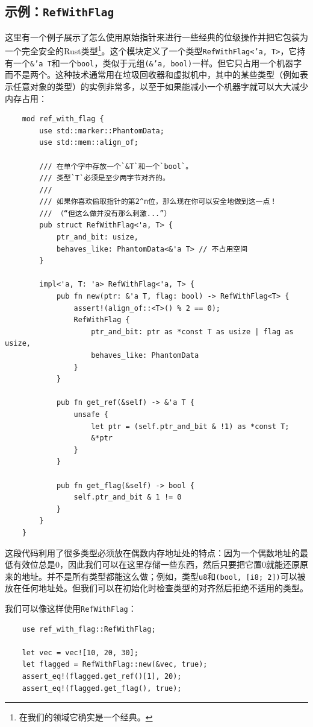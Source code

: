 \subsection{示例：\texttt{RefWithFlag}}\label{RefWithFlag}
这里有一个例子展示了怎么使用原始指针来进行一些经典的位级操作并把它包装为一个完全安全的Rust类型\footnote{在我们的领域它确实是一个经典。}。这个模块定义了一个类型\texttt{RefWithFlag<'a, T>}，它持有一个\texttt{\&'a T}和一个\texttt{bool}，类似于元组\texttt{(\&'a, bool)}一样。但它只占用一个机器字而不是两个。这种技术通常用在垃圾回收器和虚拟机中，其中的某些类型（例如表示任意对象的类型）的实例非常多，以至于如果能减小一个机器字就可以大大减少内存占用：
\begin{verbatim}
    mod ref_with_flag {
        use std::marker::PhantomData;
        use std::mem::align_of;

        /// 在单个字中存放一个`&T`和一个`bool`。
        /// 类型`T`必须是至少两字节对齐的。
        ///
        /// 如果你喜欢偷取指针的第2^n位，那么现在你可以安全地做到这一点！
        /// （“但这么做并没有那么刺激...”）
        pub struct RefWithFlag<'a, T> {
            ptr_and_bit: usize,
            behaves_like: PhantomData<&'a T> // 不占用空间
        }

        impl<'a, T: 'a> RefWithFlag<'a, T> {
            pub fn new(ptr: &'a T, flag: bool) -> RefWithFlag<T> {
                assert!(align_of::<T>() % 2 == 0);
                RefWithFlag {
                    ptr_and_bit: ptr as *const T as usize | flag as usize,
                    behaves_like: PhantomData
                }
            }

            pub fn get_ref(&self) -> &'a T {
                unsafe {
                    let ptr = (self.ptr_and_bit & !1) as *const T;
                    &*ptr
                }
            }

            pub fn get_flag(&self) -> bool {
                self.ptr_and_bit & 1 != 0
            }
        }
    }
\end{verbatim}

这段代码利用了很多类型必须放在偶数内存地址处的特点：因为一个偶数地址的最低有效位总是0，因此我们可以在这里存储一些东西，然后只要把它置0就能还原原来的地址。并不是所有类型都能这么做；例如，类型\texttt{u8}和\texttt{(bool, [i8; 2])}可以被放在任何地址处。但我们可以在初始化时检查类型的对齐然后拒绝不适用的类型。

我们可以像这样使用\texttt{RefWithFlag}：
\begin{verbatim}
    use ref_with_flag::RefWithFlag;

    let vec = vec![10, 20, 30];
    let flagged = RefWithFlag::new(&vec, true);
    assert_eq!(flagged.get_ref()[1], 20);
    assert_eq!(flagged.get_flag(), true);
\end{verbatim}

